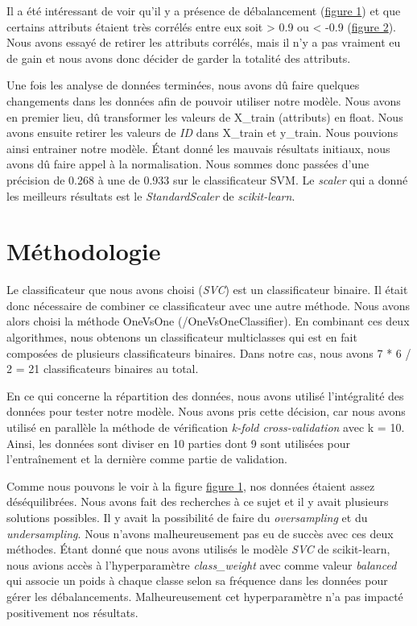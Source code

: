\documentclass[12pt]{extarticle}
\begin{document}
\vspace{5mm}

Il a été intéressant de voir qu'il y a présence de débalancement (\hyperref[fig:barchart]{figure 1}) et que certains attributs étaient très corrélés entre eux soit > 0.9 ou < -0.9 (\hyperref[fig:heatmap]{figure 2}). Nous avons essayé de retirer les attributs corrélés, mais il n'y a pas vraiment eu de gain et nous avons donc décider de garder la totalité des attributs.

Une fois les analyse de données terminées, nous avons dû faire quelques changements dans les données afin de pouvoir utiliser notre modèle. Nous avons en premier lieu, dû transformer les valeurs de X\_train (attributs) en float. Nous avons ensuite retirer les valeurs de \emph{ID} dans X\_train et y\_train. Nous pouvions ainsi entrainer notre modèle. Étant donné les mauvais résultats initiaux, nous avons dû faire appel à la normalisation. Nous sommes donc passées d'une précision de 0.268 à une de 0.933 sur le classificateur SVM. Le \emph{scaler} qui a donné les meilleurs résultats est le \emph{StandardScaler} de \emph{scikit-learn}.

\section{Méthodologie}
\label{sec:org58faee5}
Le classificateur que nous avons choisi (\emph{SVC}) est un classificateur binaire. Il était donc nécessaire de combiner ce classificateur avec une autre méthode. Nous avons alors choisi la méthode OneVsOne (/OneVsOneClassifier). En combinant ces deux algorithmes, nous obtenons un classificateur multiclasses qui est en fait composées de plusieurs classificateurs binaires. Dans notre cas, nous avons 7 * 6 / 2 = 21 classificateurs binaires au total.

En ce qui concerne la répartition des données, nous avons utilisé l'intégralité des données pour tester notre modèle. Nous avons pris cette décision, car nous avons utilisé en parallèle la méthode de vérification \emph{k-fold cross-validation} avec k = 10. Ainsi, les données sont diviser en 10 parties dont 9 sont utilisées pour l'entraînement et la dernière comme partie de validation.

Comme nous pouvons le voir à la figure \hyperref[fig:barchart]{figure 1}, nos données étaient assez déséquilibrées. Nous avons fait des recherches à ce sujet et il y avait plusieurs solutions possibles. Il y avait la possibilité de faire du \emph{oversampling} et du \emph{undersampling}. Nous n'avons malheureusement pas eu de succès avec ces deux méthodes. Étant donné que nous avons utilisés le modèle \emph{SVC} de scikit-learn, nous avions accès à l'hyperparamètre \emph{class\_weight} avec comme valeur \emph{balanced} qui associe un poids à chaque classe selon sa fréquence dans les données pour gérer les débalancements. Malheureusement cet hyperparamètre n'a pas impacté positivement nos résultats.
\end{document}
